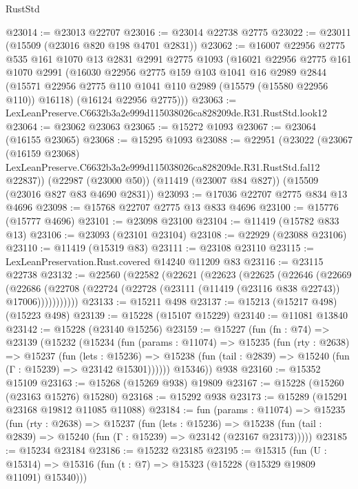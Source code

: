 \begin{lexlean}{RustStd}
\begin{coremodule}
@23014 := @23013 @22707
@23016 := @23014 @22738 @2775
@23022 := @23011 (@15509 (@23016 @820 @198 @4701 @2831))
@23062 := @16007
    @22956
    @2775
    @535
    @161
    @1070
    @13
    @2831
    @2991
    @2775
    @1093
    (@16021
      @22956
      @2775
      @161
      @1070
      @2991
      (@16030
        @22956
        @2775
        @159
        @103
        @1041
        @16
        @2989
        @2844
        (@15571 @22956 @2775 @110 @1041 @110 @2989 (@15579 (@15580 @22956 @110)) @16118)
        (@16124 @22956 @2775)))
@23063 := LexLeanPreserve.C6632b3a2e999d115038026ca828209de.R31.RustStd.look12
@23064 := @23062 @23063
@23065 := @15272 @1093
@23067 := @23064 (@16155 @23065)
@23068 := @15295 @1093
@23088 := @22951
    (@23022
      (@23067
        (@16159 @23068)
        LexLeanPreserve.C6632b3a2e999d115038026ca828209de.R31.RustStd.fal12
        @22837))
    (@22987 (@23000 @50))
    (@11419 (@23007 @84 @827))
    (@15509 (@23016 @827 @83 @4690 @2831))
@23093 := @17036 @22707 @2775 @834 @13 @4696
@23098 := @15768 @22707 @2775 @13 @833 @4696
@23100 := @15776 (@15777 @4696)
@23101 := @23098 @23100
@23104 := @11419 (@15782 @833 @13)
@23106 := @23093 (@23101 @23104)
@23108 := @22929 (@23088 @23106)
@23110 := @11419 (@15319 @83)
@23111 := @23108 @23110
@23115 := LexLeanPreservation.Rust.covered @14240 @11209 @83
@23116 := @23115 @22738
@23132 := @22560
    (@22582
      (@22621
        (@22623
          (@22625
            (@22646
              (@22669
                (@22686
                  (@22708 (@22724 (@22728 (@23111 (@11419 (@23116 @838 @22743)) @17006)))))))))))
@23133 := @15211 @498
@23137 := @15213 (@15217 @498) (@15223 @498)
@23139 := @15228 (@15107 @15229)
@23140 := @11081 @13840
@23142 := @15228 (@23140 @15256)
@23159 := @15227
    (fun (fn : @74) =>
    @23139
      (@15232
        (@15234
          (fun (params : @11074) =>
          @15235
            (fun (rty : @2638) =>
            @15237
              (fun (lets : @15236) =>
              @15238 (fun (tail : @2839) => @15240 (fun (Γ : @15239) => @23142 @15301))))))
        @15346))
    @938
@23160 := @15352 @15109
@23163 := @15268 (@15269 @938) @19809
@23167 := @15228 (@15260 (@23163 @15276) @15280)
@23168 := @15292 @938
@23173 := @15289 (@15291 @23168 @19812 @11085 @11088)
@23184 := fun (params : @11074) =>
  @15235
    (fun (rty : @2638) =>
    @15237
      (fun (lets : @15236) =>
      @15238 (fun (tail : @2839) => @15240 (fun (Γ : @15239) => @23142 (@23167 @23173)))))
@23185 := @15234 @23184
@23186 := @15232 @23185
@23195 := @15315
    (fun (U : @15314) => @15316 (fun (t : @7) => @15323 (@15228 (@15329 @19809 @11091) @15340)))

\end{coremodule}
\end{lexlean}
